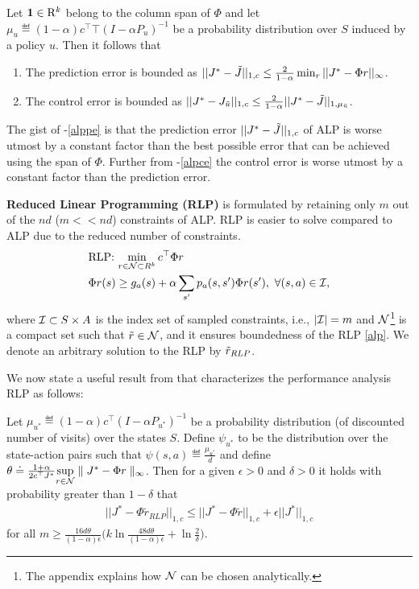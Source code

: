 \begin{theorem}\label{alpvanilla}
Let $\mathbf{1}\in \mathrm{R}^k$ belong to the column span of $\Phi$ and let $\mu_u\eqdef (1-\alpha)c^\top\top(I-\alpha P_u)^{-1}$ be a probability distribution over $S$ induced by a policy $u$. Then it follows that
\begin{enumerate}
\item\label{alppe} The prediction error is bounded as $||J^*-\tilde{J}||_{1,c}\leq \frac{2}{1-\alpha}\min_{r}||J^*-\Phi r||_\infty$.
\item\label{alpce} The control error is bounded as $||J^*-J_{\tilde{u}}||_{1,c}\leq \frac{2}{1-\alpha}||J^*-\tilde{J}||_{1,\mu_{\tilde{u}}}$.
\end{enumerate}
\end{theorem}
The gist of -\eqref{alppe} is that the prediction error $||J^*-\tilde{J}||_{1,c}$ of ALP is worse utmost by a constant factor than the best possible error that can be achieved using the span of $\Phi$. Further from -\eqref{alpce} the control error is worse utmost by a constant factor than the prediction error.\par
\textbf{Reduced Linear Programming (RLP)} is formulated by retaining only $m$ out of the $nd$ ($m<<nd$) constraints of ALP. RLP is easier to solve compared to ALP due to the reduced number of constraints.
\begin{align}\label{rlp}
\begin{split}
&\text{RLP:~}\underset{r\in \N\subset R^k}{\min}\, c^\top \Phi r\,\,\\
&\Phi r (s)\geq g_a(s)+\alpha\sum_{s'}p_a(s,s')\Phi r(s'),\,\,
\forall (s,a)\in \I,
\end{split}
\end{align}
where $\mathcal{I}\subset S \times A$ is the index set of sampled constraints, i.e., $|\mathcal{I}|=m$ and $\mathcal{N}$\footnote{The appendix explains how $\mathcal{N}$ can be chosen analytically.} is a compact set such that $\tilde{r} \in \mathcal{N}$, and it ensures boundedness of the RLP \eqref{alp}. We denote an arbitrary solution to the RLP by $\tilde{r}_{RLP}$.\par
We now state a useful result from \cite{CS} that characterizes the performance analysis RLP as follows:
\begin{theorem}\label{rlpt}
Let $\mu_{u^*}\eqdef(1-\alpha)c^\top (I-\alpha P_{u^*})^{-1}$ be a probability distribution (of discounted number of visits) over the states $S$. Define $\psi_{u^*}$ to be the distribution over the state-action pairs such that $\psi(s,a)\eqdef \frac{\mu_{u^*}}{d}$ and define $\theta\doteq\frac{1+\alpha}{2 c^\top J^*}\underset{r\in \mathcal{N}}{\sup}\parallel J^*-\Phi r \parallel_\infty$. Then for a given $\epsilon>0$ and $\delta>0$ it holds with probability greater than $1-\delta$ that
\begin{align*}
||J^*-\Phi\tilde{r}_{RLP}||_{1,c}\leq ||J^*-\Phi\tilde{r}||_{1,c}+\epsilon ||J^*||_{1,c}
\end{align*}
for all $m\geq \frac{16d\theta}{(1-\alpha)\epsilon}\big(k\ln\frac{48d\theta}{(1-\alpha)\epsilon}+\ln \frac{2}{\delta}\big)$.
\end{theorem}
